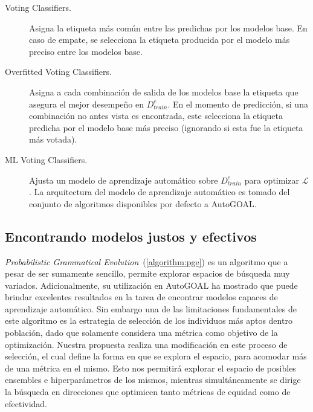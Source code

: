 \begin{description}

    \item[Voting Classifiers.]
    Asigna la etiqueta más común entre las predichas por los modelos base.
    En caso de empate, se selecciona la etiqueta producida por el modelo más preciso entre los modelos base.
    
    \item[Overfitted Voting Classifiers.]
    Asigna a cada combinación de salida de los modelos base la etiqueta que asegura el mejor desempeño en $D_{train}^e$.
    En el momento de predicción, si una combinación no antes vista es encontrada, este selecciona la etiqueta predicha por el modelo base más preciso (ignorando si esta fue la etiqueta más votada).
    
    \item[ML Voting Classifiers.]
    Ajusta un modelo de aprendizaje automático sobre $D_{train}^e$ para optimizar $\mathcal{L}$.
    La arquitectura del modelo de aprendizaje automático es tomado del conjunto de algoritmos disponibles por defecto a AutoGOAL.
    
\end{description}


\subsection{Encontrando modelos justos y efectivos}

\emph{Probabilistic Grammatical Evolution}~(\ref{algorithm:pge}) es un algoritmo que a pesar de ser sumamente sencillo, permite explorar espacios de búsqueda muy variados.
Adicionalmente, su utilización en AutoGOAL ha mostrado que puede brindar excelentes resultados en la tarea de encontrar modelos capaces de aprendizaje automático.
Sin embargo una de las limitaciones fundamentales de este algoritmo es la estrategia de selección de los individuos más aptos dentro población, dado que solamente considera una métrica como objetivo de la optimización.
Nuestra propuesta realiza una modificación en este proceso de selección, el cual define la forma en que se explora el espacio, para acomodar más de una métrica en el mismo.
Esto nos permitirá explorar el espacio de posibles ensembles e hiperparámetros de los mismos, mientras simultáneamente se dirige la búsqueda en direcciones que optimicen tanto métricas de equidad como de efectividad.

